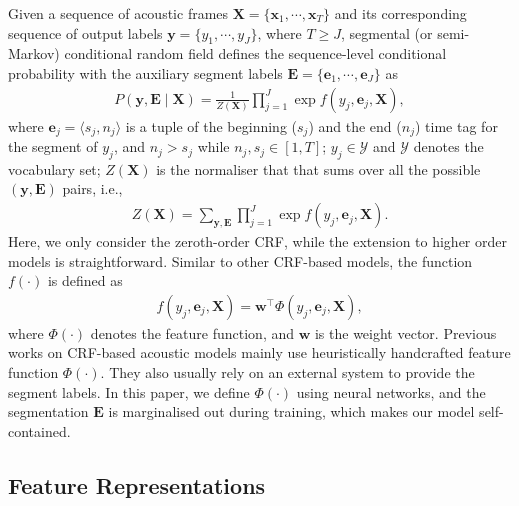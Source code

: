 \documentclass[a4paper]{article}
\begin{document}
Given a sequence of acoustic frames $\mathbf{X} = \{\mathbf{x}_1, \cdots, \mathbf{x}_T\}$ and its corresponding sequence of output labels $\mathbf{y} = \{y_1, \cdots, y_J\}$, where $T\ge J$, segmental (or semi-Markov) conditional random field defines the sequence-level conditional probability with the auxiliary segment labels $\mathbf{E} = \{\mathbf{e}_1, \cdots, \mathbf{e}_J\}$ as
\begin{align}
\label{eq:crf}
P(\mathbf{y}, \mathbf{E} \mid \mathbf{X}) = \frac{1}{Z(\mathbf{X})} \prod_{j=1}^J \exp f \left( y_j, \mathbf{e}_j, \mathbf{X} \right),
\end{align}
where $\mathbf{e}_j = \langle s_{j}, n_{j} \rangle$ is a tuple of the beginning ($s_{j}$) and the end ($n_{j}$) time tag for the segment of $y_j$, and $n_j > s_j $ while $n_j, s_j \in [1, T]$; $y_j \in \mathcal{Y}$ and $\mathcal{Y}$ denotes the vocabulary set; $Z(\mathbf{X})$ is the normaliser that that sums over all the possible $(\mathbf{y, E})$ pairs, i.e.,
\begin{align}
Z(\mathbf{X}) = \sum_{\mathbf{y,E}} \prod_{j=1}^J \exp f \left( y_j, \mathbf{e}_j, \mathbf{X} \right).
\end{align}
Here, we only consider the zeroth-order CRF, while the extension to higher order models is straightforward. Similar to other CRF-based models, the function $f(\cdot)$ is defined as
\begin{align}
\label{eq:phi}
f \left( y_j, \mathbf{e}_j, \mathbf{X} \right) = \mathbf{w}^\top \Phi (y_j, \mathbf{e}_j, \mathbf{X}),
\end{align}
where $\Phi(\cdot)$ denotes the feature function, and $\mathbf{w}$ is the weight vector. Previous works on CRF-based acoustic models mainly use heuristically handcrafted feature function $\Phi(\cdot)$. They also usually rely on an external system to provide the segment labels. In this paper, we define $\Phi(\cdot)$ using neural networks, and the segmentation $\mathbf{E}$ is marginalised out during training, which makes our model self-contained. 

\subsection{Feature Representations}
\end{document}

